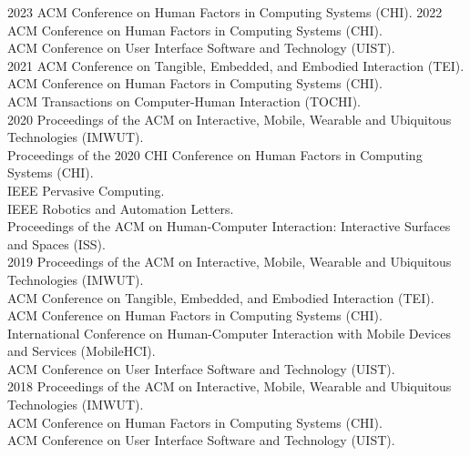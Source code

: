     \begin{cvreviews}
      \cvreview
        {2023}
        {ACM Conference on Human Factors in Computing Systems (CHI).}
      \cvreview
        {2022}
        {ACM Conference on Human Factors in Computing Systems (CHI).\\
        ACM Conference on User Interface Software and Technology (UIST). \\}
      \cvreview
        {2021}
        {ACM Conference on Tangible, Embedded, and Embodied Interaction (TEI).\\
        ACM Conference on Human Factors in Computing Systems (CHI).\\
        ACM Transactions on Computer-Human Interaction (TOCHI).\\}
      \cvreview
        {2020}
        {Proceedings of the ACM on Interactive, Mobile, Wearable and Ubiquitous Technologies (IMWUT).\\
        Proceedings of the 2020 CHI Conference on Human Factors in Computing Systems (CHI).\\
        IEEE Pervasive Computing.\\
        IEEE Robotics and Automation Letters.\\
        Proceedings of the ACM on Human-Computer Interaction: Interactive Surfaces and Spaces (ISS).\\}
      \cvreview
        {2019}
        {Proceedings of the ACM on Interactive, Mobile, Wearable and Ubiquitous Technologies (IMWUT).\\
        ACM Conference on Tangible, Embedded, and Embodied Interaction (TEI).\\
        ACM Conference on Human Factors in Computing Systems (CHI).\\
        International Conference on Human-Computer Interaction with Mobile Devices and Services (MobileHCI).\\
        ACM Conference on User Interface Software and Technology (UIST). \\}
      \cvreview
        {2018}
        {Proceedings of the ACM on Interactive, Mobile, Wearable and Ubiquitous Technologies (IMWUT).\\
        ACM Conference on Human Factors in Computing Systems (CHI).\\
        ACM Conference on User Interface Software and Technology (UIST). \\}
    \end{cvreviews}